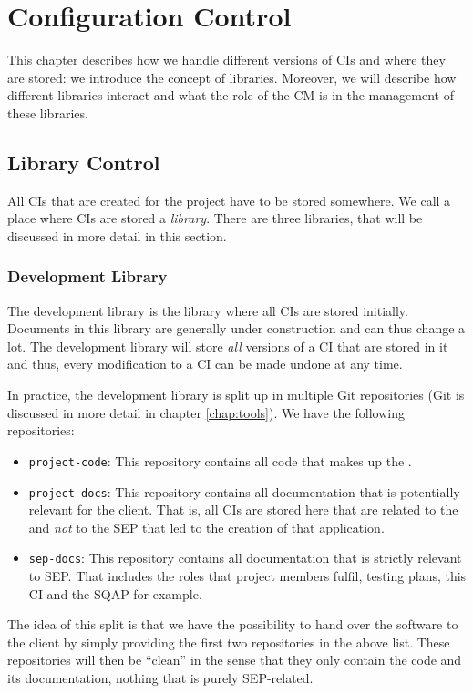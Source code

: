 \chapter{Configuration Control}
\label{chap:configurationcontrol}
This chapter describes how we handle different versions of CIs and where they are stored: we introduce the concept of libraries. Moreover, we will describe how different libraries interact and what the role of the CM is in the management of these libraries.

\section{Library Control}
\label{sec:configcontrol-library}
All CIs that are created for the \projectname{} project have to be stored somewhere. We call a place where CIs are stored a \emph{library}. There are three libraries, that will be discussed in more detail in this section.

\subsection{Development Library}
\label{subsec:configcontrol-library-dev}
The development library is the library where all CIs are stored initially. Documents in this library are generally under construction and can thus change a lot. The development library will store \emph{all} versions of a CI that are stored in it and thus, every modification to a CI can be made undone at any time.

In practice, the development library is split up in multiple Git repositories (Git is discussed in more detail in chapter \ref{chap:tools}). We have the following repositories:
\begin{itemize}
	\item \texttt{project-code}: This repository contains all code that makes up the \applicationname{}.
	\item \texttt{project-docs}: This repository contains all documentation that is potentially relevant for the client. That is, all CIs are stored here that are related to the \applicationname{} and \emph{not} to the SEP that led to the creation of that application.
	\item \texttt{sep-docs}: This repository contains all documentation that is strictly relevant to SEP. That includes the roles that project members fulfil,  testing plans, this CI and the SQAP for example.
\end{itemize}
The idea of this split is that we have the possibility to hand over the software to the client by simply providing the first two repositories in the above list. These repositories will then be ``clean'' in the sense that they only contain the code and its documentation, nothing that is purely SEP-related.

